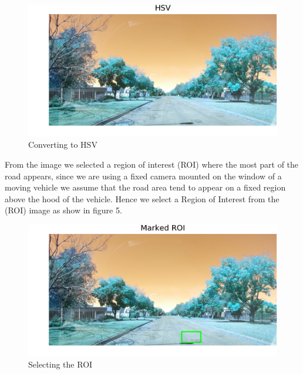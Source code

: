 \documentclass[journal]{IEEEtran}
\begin{document}
\begin{figure}[!htb]
\begin{center}
\includegraphics[scale=1]{Images/1_HSV.png}
\end{center}
\caption{Converting to HSV}
\end{figure}

\vspace{0.5cm}

\noindent From the image we selected a region of interest (ROI) where the most part of the road appears, since we are using a fixed camera mounted on the window of a moving vehicle we assume that the road area tend to appear on a fixed region above the hood of the vehicle. Hence we select a Region of Interest from the (ROI) image as show in figure 5.

\begin{figure}[!htb]
\begin{center}
\includegraphics[scale=1]{Images/2_Marked_ROI.png}
\end{center}
\caption{Selecting the ROI}
\end{figure}

\vspace{0.5cm}
\end{document}
